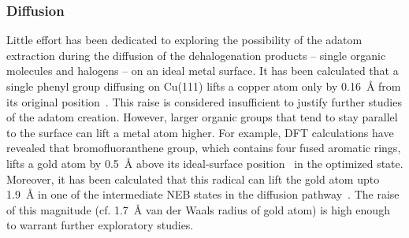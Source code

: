 \documentclass[%
 reprint,
 amsmath,amssymb,
 aps,
prb,
floatfix,
]{revtex4-2}
\newcommand{\lock}{\color{red}}
\newcommand{\lock}{\color{black}}
\begin{document}
\ifdefined\INTERNAL

\subsubsection{Diffusion}


\fi

{\lock

Little effort has been dedicated to exploring the possibility of the adatom extraction during the diffusion of the dehalogenation products  -- single organic molecules and halogens -- on an ideal metal surface. 
%
%
It has been calculated that a single phenyl group diffusing on Cu(111) lifts a copper atom only by \SI{0.16}{\angstrom} from its original position~\cite{pccp2010}. 
This raise is considered insufficient to justify further studies of the adatom creation.
However, larger organic groups that tend to stay parallel to the surface can lift a metal atom higher. 
For example, DFT calculations have revealed that bromofluoranthene group, which contains four fused aromatic rings, lifts a gold atom by \SI{0.5}{\angstrom} above its ideal-surface position~\cite{jpcc2018} in the optimized state. 
Moreover, it has been calculated that this radical can lift the gold atom upto \SI{1.9}{\angstrom} in one of the intermediate NEB states in the diffusion pathway~\cite{jpcc2018}.
The raise of this magnitude (cf. \SI{1.7}{\angstrom} van der Waals radius of gold atom) is high enough to warrant further exploratory studies.


}
\end{document}
